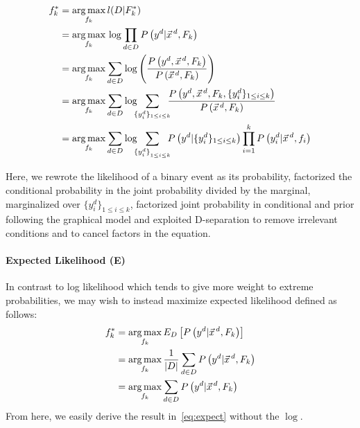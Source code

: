 {\small 
\begin{align}
f_k^*&=\argmax_{f_k} l(D|F^*_k) \nonumber\\
&=\argmax_{f_k}\,\log\prod_{d\in D}P\left(y^d|\vec{x}^{\,d},F_k\right)\nonumber\\
&=\argmax_{f_k}\sum_{d\in D}\log\left(\frac{P\left(y^d,\vec{x}^{\,d},F_k\right)}{P\left(\vec{x}^{\,d},F_k\right)}\right)\nonumber \\
&=\argmax_{f_k}\sum_{d\in D}\log \!\!\! \sum_{\{y_i^d\}_{1\leq i\leq k}} \!\!\! \frac{P\left(y^d,\vec{x}^{\,d}, F_k,\{y_i^d\}_{1\leq i\leq k}\right)}{P\left(\vec{x}^{\,d},F_k\right)}\nonumber\\
&=\argmax_{f_k}\sum_{d\in D}\log \!\!\! \sum_{{\{y_i^d\}}_{1\leq i\leq k}} \!\!\! P\left(y^d|\{y^d_i\}_{1\leq i\leq k}\right) \prod_{i=1}^kP\left(y_i^d|\vec{x}^{\,d},f_i\right) \label{eq:expect} 
\end{align}}

Here, we rewrote the likelihood of a binary event as its probability,
factorized the conditional probability in the joint probability
divided by the marginal, marginalized over $\{y^d_i\}_{1\leq i\leq
  k}$, factorized joint probability in conditional and prior following
the graphical model and exploited D-separation to remove irrelevant
conditions and to cancel factors in the equation.

\paragraph{Expected Likelihood (E)}

In contrast to log likelihood which tends to give more weight to extreme
probabilities, we may wish to instead maximize expected likelihood
defined as follows:
\begin{align*}
f_k^*&=\argmax_{f_k}E_D\left[P\left(y^d|\vec{x}^{\,d},F_k\right)\right]\nonumber\\
&=\argmax_{f_k}\frac{1}{|D|}\sum_{d\in D} P\left(y^d | \vec{x}^{\,d},F_k\right)\nonumber\\
&=\argmax_{f_k} \sum_{d\in D} P\left(y^d | \vec{x}^{\,d},F_k\right)\nonumber
\end{align*}
From here, we easily derive the result in~\eqref{eq:expect} without the $\log$.

